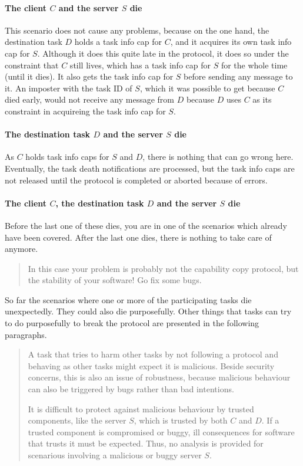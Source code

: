 \documentclass[9pt,a4paper]{extarticle}
\newenvironment{comment}{\footnotesize \begin{quote}}{\end{quote}}
\begin{document}
\paragraph{The client $C$ and the server $S$ die}

This scenario does not cause any problems, because on the one hand,
the destination task $D$ holds a task info cap for $C$, and it
acquires its own task info cap for $S$.  Although it does this quite
late in the protocol, it does so under the constraint that $C$ still
lives, which has a task info cap for $S$ for the whole time (until it
dies).  It also gets the task info cap for $S$ before sending any
message to it.  An imposter with the task ID of $S$, which it was
possible to get because $C$ died early, would not receive any message
from $D$ because $D$ uses $C$ as its constraint in acquireing the task
info cap for $S$.

\paragraph{The destination task $D$ and the server $S$ die}

As $C$ holds task info caps for $S$ and $D$, there is nothing that can
go wrong here.  Eventually, the task death notifications are
processed, but the task info caps are not released until the protocol
is completed or aborted because of errors.

\paragraph{The client $C$, the destination task $D$ and the server $S$ die}

Before the last one of these dies, you are in one of the scenarios
which already have been covered.  After the last one dies, there is
nothing to take care of anymore.

\begin{comment}
  In this case your problem is probably not the capability copy
  protocol, but the stability of your software!  Go fix some bugs.
\end{comment}

So far the scenarios where one or more of the participating tasks die
unexpectedly.  They could also die purposefully.  Other things that
tasks can try to do purposefully to break the protocol are presented
in the following paragraphs.

\begin{comment}
  A task that tries to harm other tasks by not following a protocol
  and behaving as other tasks might expect it is malicious.  Beside
  security concerns, this is also an issue of robustness, because
  malicious behaviour can also be triggered by bugs rather than bad
  intentions.
  
  It is difficult to protect against malicious behaviour by trusted
  components, like the server $S$, which is trusted by both $C$ and
  $D$.  If a trusted component is compromised or buggy, ill
  consequences for software that trusts it must be expected.  Thus, no
  analysis is provided for scenarious involving a malicious or buggy
  server $S$.
\end{comment}
\end{document}
